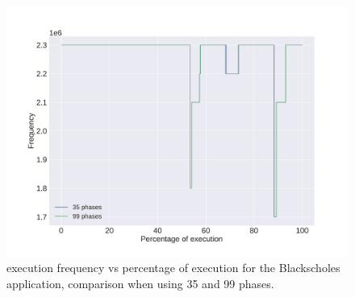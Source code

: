 \begin{figure}[h]
	\centering
	\includegraphics[width=\columnwidth]{phases/figures/signals/completo_black_1_freq_signals_cmp.pdf}
	\caption{execution frequency vs percentage of execution for the Blackscholes application, comparison when using 35 and 99 phases.}
	\label{fig:black_control_2}
\end{figure}%

